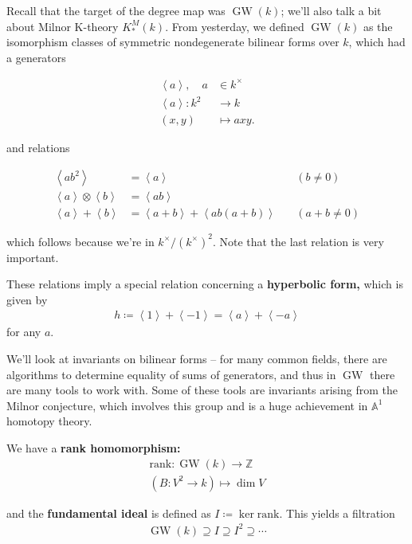 Recall that the target of the degree map was \({\operatorname{GW}}(k)\);
we'll also talk a bit about Milnor K-theory \(K^M_*(k)\). From
yesterday, we defined \({\operatorname{GW}}(k)\) as the isomorphism
classes of symmetric nondegenerate bilinear forms over \(k\), which had
a generators

\begin{align*} \left\langle{a}\right\rangle, \quad a &\in k^\times\\ \left\langle{a}\right\rangle: k^2 &\to k\\ (x,y) &\mapsto axy .\end{align*}

and relations

\begin{align*} \left\langle{ab^2}\right\rangle &= \left\langle{a}\right\rangle \quad&(b\neq 0)\\ \left\langle{a}\right\rangle\otimes\left\langle{b}\right\rangle &= \left\langle{ab}\right\rangle &\\ \left\langle{a}\right\rangle + \left\langle{b}\right\rangle &= \left\langle{a+b}\right\rangle + \left\langle{ab(a+b)}\right\rangle \quad&(a+b\neq 0) \end{align*}

which follows because we're in \(k^\times/(k^\times)^2\). Note that the
last relation is very important.

These relations imply a special relation concerning a \textbf{hyperbolic
form,} which is given by
\begin{align*}
h\coloneqq\left\langle{1}\right\rangle + \left\langle{-1}\right\rangle = \left\langle{a}\right\rangle + \left\langle{-a}\right\rangle
\end{align*}
for any \(a\).

We'll look at invariants on bilinear forms -- for many common fields,
there are algorithms to determine equality of sums of generators, and
thus in \({\operatorname{GW}}\) there are many tools to work with. Some
of these tools are invariants arising from the Milnor conjecture, which
involves this group and is a huge achievement in \({\mathbb{A}}^1\)
homotopy theory.

We have a \textbf{rank homomorphism:}
\begin{align*}
\text{rank}: {\operatorname{GW}}(k) \to {\mathbb{Z}}\\
(B: V^2 \to k) \mapsto \dim V
\end{align*}

and the \textbf{fundamental ideal} is defined as
\(I \coloneqq\ker \text{rank}\). This yields a filtration
\begin{align*}
{\operatorname{GW}}(k) \supseteq I \supseteq I^2 \supseteq \cdots
\end{align*}

